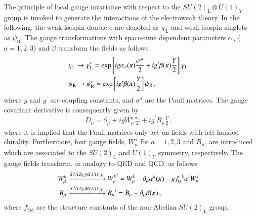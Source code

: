 The principle of local gauge invariance with respect to the
$SU(2)_{\text{L}} \otimes U(1)_Y$ group is invoked to generate the interactions
of the electroweak theory. In the following, the weak isospin doublets are
denoted as $\chi_{\text{L}}$ and weak isospin singlets as $\psi_{\text{R}}$. The
gauge transformations with space-time dependent parameters $\alpha_a$
($a = 1, 2, 3$) and $\beta$ transform the fields as follows
\begin{align*}
  &\chi_{\text{L}} \to \chi_{\text{L}}^\prime = \exp\left[ i g \alpha_a(\myvec{x}) \frac{\sigma^a}{2} + i g^\prime \beta(\myvec{x}) \frac{Y}{2} \right] \chi_{\text{L}} \\
  &\psi_{\text{R}} \to \psi_{\text{R}}^\prime = \exp\left[ i g^\prime \beta(\myvec{x}) \frac{Y}{2} \right] \psi_{\text{R}} \,\text{,}
\end{align*}
where $g$ and $g^\prime$ are coupling constants, and $\sigma^a$ are the Pauli
matrices. The gauge covariant derivative is consequently given by
\begin{align*}
  D_\mu = \partial_\mu
  + i g W^a_\mu \frac{\sigma_a}{2}
  + i g^\prime B_\mu \frac{Y}{2} \,\text{,}
\end{align*}
where it is implied that the Pauli matrices only act on fields with left-handed
chirality. Furthermore, four gauge fields, $W_\mu^a$ for $a = 1, 2, 3$ and
$B_\mu$, are introduced which are associated to the $SU(2)_{\text{L}}$ and
$U(1)_Y$ symmetry, respectively. The gauge fields transform, in analogy to QED
and QCD, as follows
\begin{align*}
  W_\mu^k &\xrightarrow{SU(2)_{\text{L}} \otimes SU(1)_Y} {W_\mu^k}^\prime = W_\mu^k - \partial_\mu \alpha^{k}(\myvec{x}) - g {f_{ij}}^k \alpha^{i} W_\mu^j \\
  B_\mu   &\xrightarrow{SU(2)_{\text{L}} \otimes SU(1)_Y} {B_\mu}^\prime = B_\mu - \partial_\mu \beta(\myvec{x}) \,\text{,}
\end{align*}
where $f_{ijk}$ are the structure constants of the non-Abelian
$SU(2)_{\text{L}}$ group.

